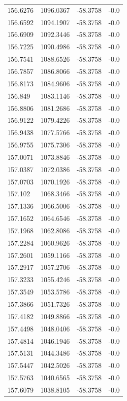 \begin{table}[H]
\begin{tabular}{llll}
156.6276 & 1096.0367 & -58.3758 & -0.0 \\
156.6592 & 1094.1907 & -58.3758 & -0.0 \\
156.6909 & 1092.3446 & -58.3758 & -0.0 \\
156.7225 & 1090.4986 & -58.3758 & -0.0 \\
156.7541 & 1088.6526 & -58.3758 & -0.0 \\
156.7857 & 1086.8066 & -58.3758 & -0.0 \\
156.8173 & 1084.9606 & -58.3758 & -0.0 \\
156.849 & 1083.1146 & -58.3758 & -0.0 \\
156.8806 & 1081.2686 & -58.3758 & -0.0 \\
156.9122 & 1079.4226 & -58.3758 & -0.0 \\
156.9438 & 1077.5766 & -58.3758 & -0.0 \\
156.9755 & 1075.7306 & -58.3758 & -0.0 \\
157.0071 & 1073.8846 & -58.3758 & -0.0 \\
157.0387 & 1072.0386 & -58.3758 & -0.0 \\
157.0703 & 1070.1926 & -58.3758 & -0.0 \\
157.102 & 1068.3466 & -58.3758 & -0.0 \\
157.1336 & 1066.5006 & -58.3758 & -0.0 \\
157.1652 & 1064.6546 & -58.3758 & -0.0 \\
157.1968 & 1062.8086 & -58.3758 & -0.0 \\
157.2284 & 1060.9626 & -58.3758 & -0.0 \\
157.2601 & 1059.1166 & -58.3758 & -0.0 \\
157.2917 & 1057.2706 & -58.3758 & -0.0 \\
157.3233 & 1055.4246 & -58.3758 & -0.0 \\
157.3549 & 1053.5786 & -58.3758 & -0.0 \\
157.3866 & 1051.7326 & -58.3758 & -0.0 \\
157.4182 & 1049.8866 & -58.3758 & -0.0 \\
157.4498 & 1048.0406 & -58.3758 & -0.0 \\
157.4814 & 1046.1946 & -58.3758 & -0.0 \\
157.5131 & 1044.3486 & -58.3758 & -0.0 \\
157.5447 & 1042.5026 & -58.3758 & -0.0 \\
157.5763 & 1040.6565 & -58.3758 & -0.0 \\
157.6079 & 1038.8105 & -58.3758 & -0.0 \\

\end{tabular}
\end{table}
